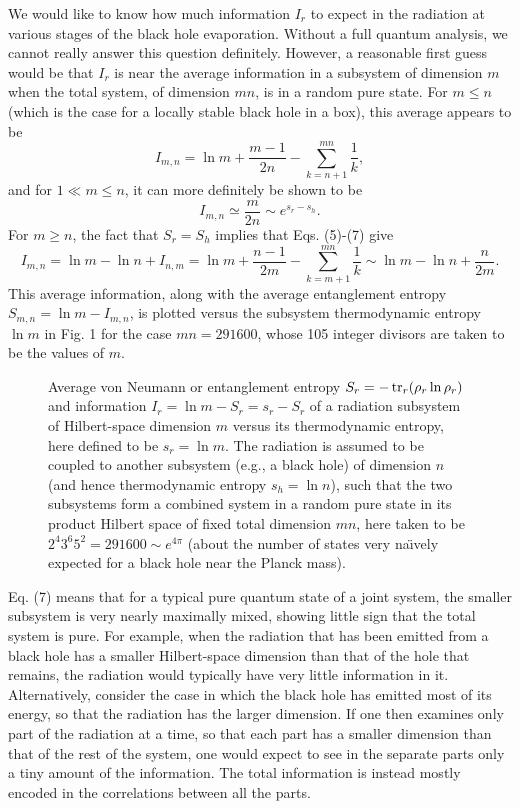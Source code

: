 \documentclass[12pt]{article}
\begin{document}
	We would like to know how much information $I_r$ to expect in
the
radiation at various stages of the black hole evaporation.  Without a
full
quantum analysis, we cannot really answer this question definitely.
However, a reasonable first guess would be that $I_r$ is near the
average
information in a subsystem of dimension $m$ when the total system,
of dimension $mn$, is in a random pure state.  For $m \leq n$
(which is the case for a locally stable black hole in a box), this
average
appears to be \cite{PagEnt}
	\begin{equation}
	I_{m,n}=\ln m + \frac{m-1}{2n}-\sum_{k=n+1}^{mn}\frac{1}{k},
	\end{equation}
and for $1 \ll m \leq n$, it can more definitely be shown to be
\cite{PagEnt}
	\begin{equation}
	I_{m,n} \simeq \frac{m}{2n} \sim e^{s_r - s_h}.
	\end{equation}
For $m \geq n$, the fact that $S_r=S_h$ implies that Eqs. (5)-(7)
give
	\begin{equation}
	I_{m,n}=\ln m - \ln n + I_{n,m}
	= \ln m + \frac{n-1}{2m}-\sum_{k=m+1}^{mn}\frac{1}{k}
	\sim \ln m - \ln n + \frac{n}{2m}.
	\end{equation}
This average information, along with the average entanglement
entropy $S_{m,n} = \ln m - I_{m,n}$, is plotted versus the subsystem
thermodynamic entropy $\ln m$ in Fig. 1 for the case $mn=291600$,
whose 105 integer divisors are taken to be the values of $m$.

\begin{figure}[p]
\centerline{}
\caption{Average von Neumann or entanglement entropy $S_r  =
-\mathop{\hbox{tr}}_r (\rho_{r} \ln \rho_{r})$ and information
$I_r = \ln m -S_r = s_r - S_r$ of a radiation subsystem of
Hilbert-space dimension $m$ versus its thermodynamic entropy,
here defined to be $s_r = \ln m$.  The radiation is assumed to be
coupled to another subsystem (e.g., a black hole) of dimension $n$
(and hence thermodynamic entropy $s_h = \ln n$), such that the
two subsystems form a combined system in a random pure state in
its product Hilbert space of fixed total dimension $mn$,
here taken to be $2^4 3^6 5^2 = 291600\sim e^{4\pi}$
(about the number of states very na\"{\i}vely expected for
a black hole near the Planck mass).}
\end{figure}

	Eq. (7) means that for a typical pure quantum state of a
joint
system, the smaller subsystem is very nearly maximally mixed,
showing little sign that the total system is pure.  For example,
when the radiation that has been emitted from a black hole has
a smaller Hilbert-space dimension than that of the hole that remains,
the radiation would typically have very little information in it.
Alternatively, consider the case in which the black hole has emitted
most of its energy, so that the radiation has the larger dimension.
If one then examines only part of the radiation at a time, so that
each part has a smaller dimension than that of the rest of the
system,
one would expect to see in the separate parts only a tiny amount
of the information.  The total information is instead mostly encoded
in the correlations between all the parts.
\end{document}
